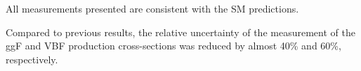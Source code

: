 


All measurements presented are consistent with the SM predictions. 

Compared to previous \RunTwo results, the relative uncertainty of the measurement of the ggF and VBF production cross-sections was reduced by almost 40\% and 60\%, respectively. 


